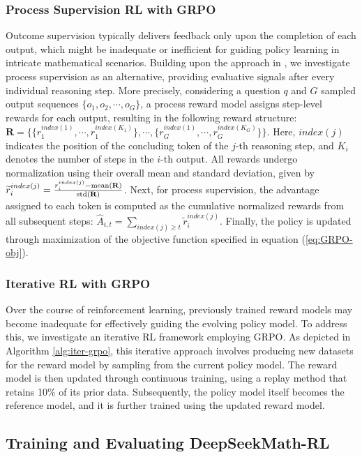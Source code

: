 \begin{itemize}[topsep=0pt]
\begin{itemize}[topsep=0pt]
\subsubsection{Process Supervision RL with GRPO} Outcome supervision typically delivers feedback only upon the completion of each output, which might be inadequate or inefficient for guiding policy learning in intricate mathematical scenarios. Building upon the approach in \cite{wang2023math}, we investigate process supervision as an alternative, providing evaluative signals after every individual reasoning step. More precisely, considering a question $q$ and $G$ sampled output sequences $\{o_1, o_2, \cdots, o_G\}$, a process reward model assigns step-level rewards for each output, resulting in the following reward structure: $\mathbf{R} = \{ \{r_1^{index(1)},\cdots,r_1^{index(K_1)}\}, \cdots,  \{r_G^{index(1)},\cdots,r_G^{index(K_G)}\} \}$. Here, $index(j)$ indicates the position of the concluding token of the $j$-th reasoning step, and $K_i$ denotes the number of steps in the $i$-th output. All rewards undergo normalization using their overall mean and standard deviation, given by $\widetilde{r}_i^{index(j)} = \frac{r_i^{index(j)} - {\rm mean(\mathbf{R})}}{{\rm std(\mathbf{R})}}$.
Next, for process supervision, the advantage assigned to each token is computed as the cumulative normalized rewards from all subsequent steps: $\hat{A}_{i, t} = \sum_{index(j) \ge t} \widetilde{r}_i^{index(j)}$.
Finally, the policy is updated through maximization of the objective function specified in equation (\ref{eq:GRPO-obj}).

\subsubsection{Iterative RL with GRPO} Over the course of reinforcement learning, previously trained reward models may become inadequate for effectively guiding the evolving policy model. To address this, we investigate an iterative RL framework employing GRPO. As depicted in Algorithm \ref{alg:iter-grpo}, this iterative approach involves producing new datasets for the reward model by sampling from the current policy model. The reward model is then updated through continuous training, using a replay method that retains 10\% of its prior data. Subsequently, the policy model itself becomes the reference model, and it is further trained using the updated reward model.

\subsection{Training and Evaluating DeepSeekMath-RL}


\end{itemize}
\end{itemize}
